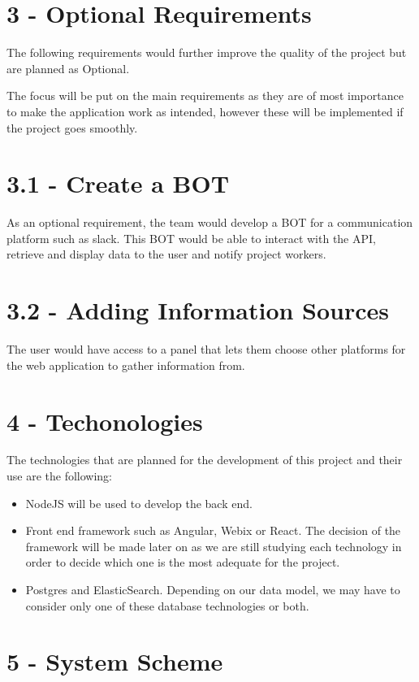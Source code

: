 \documentclass[a4paper,twoside,10pt]{article}
\begin{document}
\section*{3 - Optional Requirements}
The following requirements would further improve the quality of the project but are planned as Optional.

The focus will be put on the main requirements as they are of most importance to make the application work as intended, however these will be implemented if the project goes smoothly.

\section*{3.1 - Create a BOT}
As an optional requirement, the team would develop a BOT for a communication platform such as slack.
This BOT would be able to interact with the API, retrieve and display data to the user and notify project workers.

\section*{3.2 - Adding Information Sources}
The user would have access to a panel that lets them choose other platforms for the web application to gather information from.

\section*{4 - Techonologies}
The technologies that are planned for the development of this project and their use are the following:
\begin{itemize}
	\item NodeJS will be used to develop the back end.
	\item Front end framework such as Angular\cite{ANGULAR}, Webix\cite{WEBIX} or React\cite{REACT}. The decision of the framework will be made later on as we are still studying each technology in order to decide which one is the most adequate for the project.
	\item Postgres and ElasticSearch. Depending on our data model, we may have to consider only one of these database technologies or both.
\end{itemize}

\section*{5 - System Scheme}
\end{document}
